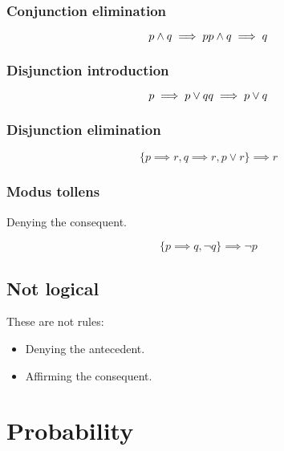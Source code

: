 \documentclass[a4paper,10pt]{report}
\begin{document}
\subsection{Conjunction elimination}

\begin{equation*}
 p \land q \implies p \\
 p \land q \implies q
\end{equation*}

\subsection{Disjunction introduction}

\begin{equation*}
 p \implies p \lor q \\
 q \implies p \lor q
\end{equation*}

\subsection{Disjunction elimination}

\begin{equation*}
 \{p \implies r, q \implies r, p \lor r\} \implies r
\end{equation*}

\subsection{Modus tollens}

Denying the consequent.

\begin{equation*}
 \{p \implies q, \lnot q\} \implies \lnot p
\end{equation*}

\section{Not logical}
These are not rules:

\begin{itemize}
 \item Denying the antecedent.
 \item Affirming the consequent.
\end{itemize}

\chapter{Probability}
\end{document}
